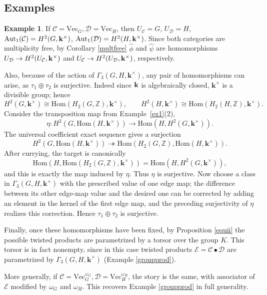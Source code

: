 \documentclass[12pt]{amsart}
\numberwithin{equation}{section}
\theoremstyle{definition}
\newtheorem{example}[theorem]{Example}
\newcommand{\Hom}{\text{Hom}}
\newcommand{\Aut}{\text{Aut}}
\newcommand{\1}{_{(1)}}
\newcommand{\2}{_{(2)}}
\newcommand{\3}{_{(3)}}
\newcommand{\4}{_{(4)}}
\newcommand{\5}{_{(5)}}
\newcommand{\6}{_{(6)}}
\newcommand{\C}{\mathcal{C}}
\theoremstyle{plain}
\theoremstyle{definition}
\theoremstyle{remark}
\def\C{\mathcal{C}}
\def\D{\mathcal{D}}
\def\E{\mathcal{E}}
\def\Aut{\mathop{\mathrm{Aut}}\nolimits}
\def\Hom{\mathrm{Hom}}
\def\Vec{\mathrm{Vec}}
\def\k{\mathbf{k}}
\begin{document}
\subsection{Examples} 

\begin{example} If $\C=\Vec_G,\D=\Vec_H$, then $U_\C=G$, $U_\D=H$, $\Aut_1(\C)=H^2(G,\bold k^\times)$, $\Aut_1(\D)=H^2(H,\bold k^\times)$. 
Since both categories are multiplicity free, by Corollary \ref{multfree} $\widehat{\phi}$ and $\widehat{\psi}$ are homomorphisms 
$U_\D\to H^2(U_\C,\bold k^\times)$ and $U_\C\to H^2(U_\D,\bold k^\times)$, respectively. 

Also, because of the action of $\Gamma_3(G,H,\k^\times)$, 
any pair of homomorphisms can arise, as $\tau_1\oplus \tau_2$ is surjective.
Indeed since $\bold k$ is algebraically closed, $\k^\times$ is a divisible group; hence
\[
        H^2(G,\k^\times)\cong \Hom(H_2(G,\mathbb Z),\k^\times),
        \qquad
        H^2(H,\k^\times)\cong \Hom(H_2(H,\mathbb Z),\k^\times).
\]
Consider the transposition map from Example~\ref{ex1}(2), 
\[
        \eta:H^2(G,\Hom(H,\k^\times))\to \Hom(H,H^2(G,\k^\times)).
\]
The universal coefficient exact sequence gives a surjection
\[
        H^2(G,\Hom(H,\k^\times))\twoheadrightarrow
        \Hom(H_2(G,\mathbb Z),\Hom(H,\k^\times)).
\]
After currying, the target is canonically
\[
        \Hom(H,\Hom(H_2(G,\mathbb Z),\k^\times))=
        \Hom(H,H^2(G,\k^\times)),
\]
and this is exactly the map induced by $\eta$.  Thus $\eta$ is surjective.  Now choose a class in $\Gamma_3(G,H,\k^\times)$ with the prescribed value of one edge map; the difference between its other edge-map value and the desired one can be corrected by adding an element in the kernel of the first edge map, and the preceding surjectivity of $\eta$ realizes this correction.  Hence $\tau_1\oplus\tau_2$ is surjective.

 Finally, once these homomorphisms 
have been fixed, by Proposition \ref{equii} the possible twisted products are parametrized by a torsor over the group $K$. This torsor is in fact nonempty, since in this case twisted products $\E=\C\bullet \D$ are parametrized by $\Gamma_3(G,H,\k^\times)$ (Example \ref{groupprod}). 

More generally, if $\C=\Vec_G^{\omega_G},\D=\Vec_H^{\omega_H}$, the story is the same, with associator of $\E$ modified by $\omega_G$ and $\omega_H$. This recovers Example \ref{groupprod} in full generality. 
\end{example} 
\end{document}
